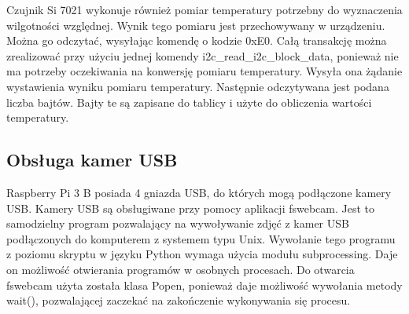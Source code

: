 \documentclass[a4paper,12pt,twoside]{article}
\begin{document}
Czujnik Si 7021 wykonuje również pomiar temperatury potrzebny do wyznaczenia wilgotności względnej. Wynik tego pomiaru jest przechowywany w urządzeniu. Można go odczytać, wysyłając komendę o kodzie 0xE0. Całą transakcję można zrealizować przy użyciu jednej komendy i2c{\_}read{\_}i2c{\_}block{\_}data, ponieważ nie ma potrzeby oczekiwania na konwersję pomiaru temperatury. Wysyła ona żądanie wystawienia wyniku pomiaru temperatury. Następnie odczytywana jest podana liczba 
bajtów. Bajty te są zapisane do tablicy i użyte do obliczenia wartości temperatury. 
\subsection{Obsługa kamer USB}
Raspberry Pi 3 B posiada 4 gniazda USB, do których mogą podłączone kamery USB. Kamery USB są obsługiwane przy pomocy aplikacji fswebcam. Jest to samodzielny program pozwalający na wywoływanie zdjęć z kamer USB podłączonych do komputerem z systemem typu Unix. Wywołanie tego programu z poziomu skryptu w języku Python wymaga użycia modułu subprocessing. Daje on możliwość otwierania programów w osobnych procesach. Do otwarcia fswebcam użyta została klasa Popen, ponieważ daje możliwość wywołania metody wait(), pozwalającej zaczekać na zakończenie wykonywania się procesu. 
\end{document}
